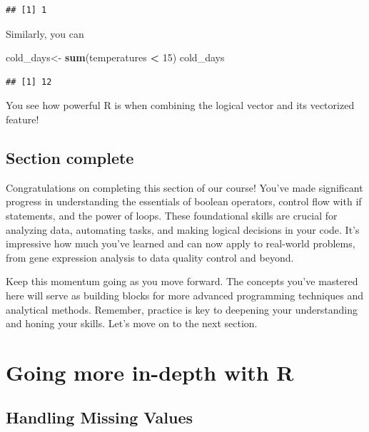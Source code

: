 \documentclass[
]{book}
\newenvironment{Shaded}{\begin{snugshade}}{\end{snugshade}}
\newcommand{\DecValTok}[1]{\textcolor[rgb]{0.00,0.00,0.81}{#1}}
\newcommand{\FunctionTok}[1]{\textcolor[rgb]{0.13,0.29,0.53}{\textbf{#1}}}
\newcommand{\NormalTok}[1]{#1}
\newcommand{\OtherTok}[1]{\textcolor[rgb]{0.56,0.35,0.01}{#1}}
\newcommand{\SpecialCharTok}[1]{\textcolor[rgb]{0.81,0.36,0.00}{\textbf{#1}}}
\begin{document}
\begin{verbatim}
## [1] 1
\end{verbatim}

Similarly, you can

\begin{Shaded}
\begin{Highlighting}[]
\NormalTok{cold\_days}\OtherTok{\textless{}{-}} \FunctionTok{sum}\NormalTok{(temperatures }\SpecialCharTok{\textless{}} \DecValTok{15}\NormalTok{)}
\NormalTok{cold\_days}
\end{Highlighting}
\end{Shaded}

\begin{verbatim}
## [1] 12
\end{verbatim}

You see how powerful R is when combining the logical vector and its vectorized feature!

\hypertarget{section-complete}{%
\section{Section complete}\label{section-complete}}

Congratulations on completing this section of our course! You've made significant progress in understanding the essentials of boolean operators, control flow with if statements, and the power of loops. These foundational skills are crucial for analyzing data, automating tasks, and making logical decisions in your code. It's impressive how much you've learned and can now apply to real-world problems, from gene expression analysis to data quality control and beyond.

Keep this momentum going as you move forward. The concepts you've mastered here will serve as building blocks for more advanced programming techniques and analytical methods. Remember, practice is key to deepening your understanding and honing your skills. Let's move on to the next section.

\hypertarget{going-more-in-depth-with-r}{%
\chapter{Going more in-depth with R}\label{going-more-in-depth-with-r}}

\hypertarget{handling-missing-values}{%
\section{Handling Missing Values}\label{handling-missing-values}}
\end{document}
